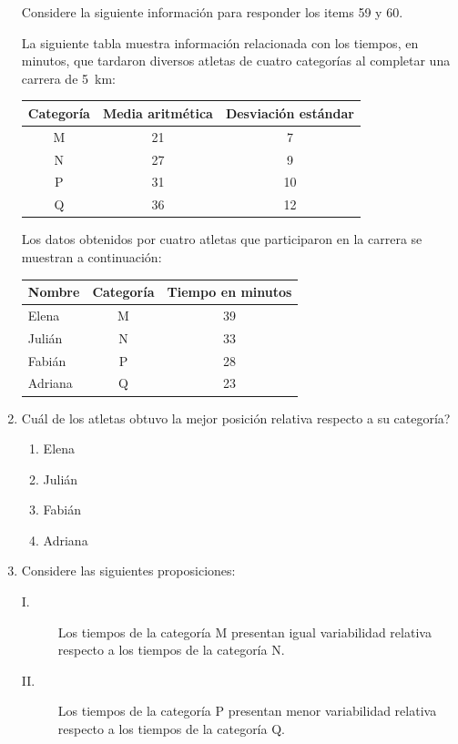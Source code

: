 \documentclass[12pt]{article}
\begin{document}
\begin{enumerate}[label=\textbf{\arabic*.}, itemsep=2.5cm]
\Needspace{0.92\textheight}
Considere la siguiente informaci\'on para responder los items 59 y 60.

La siguiente tabla muestra informaci\'on relacionada con los tiempos, en minutos, que tardaron diversos atletas de cuatro categor\'ias al completar una carrera de 5~km:

\begin{center}
\begin{tabular}{|c|c|c|}
\hline
\textbf{Categor\'ia} & \textbf{Media aritm\'etica} & \textbf{Desviaci\'on est\'andar} \\
\hline
M & 21 & 7 \\
N & 27 & 9 \\
P & 31 & 10 \\
Q & 36 & 12 \\
\hline
\end{tabular}
\end{center}

Los datos obtenidos por cuatro atletas que participaron en la carrera se muestran a continuaci\'on:

\begin{center}
\begin{tabular}{|l|c|c|}
\hline
\textbf{Nombre} & \textbf{Categor\'ia} & \textbf{Tiempo en minutos} \\
\hline
Elena   & M & 39 \\
Juli\'an  & N & 33 \\
Fabi\'an  & P & 28 \\
Adriana & Q & 23 \\
\hline
\end{tabular}
\end{center}

\item
\textquestiondown Cu\'al de los atletas obtuvo la mejor posici\'on relativa respecto a su categor\'ia?

\begin{enumerate}[label=\Alph*)]
  \item Elena
  \item Juli\'an
  \item Fabi\'an
  \item Adriana
\end{enumerate}

\item
Considere las siguientes proposiciones:

\begin{description}
  \item[I.] Los tiempos de la categor\'ia M presentan igual variabilidad relativa respecto a los tiempos de la categor\'ia N.
  \item[II.] Los tiempos de la categor\'ia P presentan menor variabilidad relativa respecto a los tiempos de la categor\'ia Q.
\end{description}


\end{enumerate}
\end{document}
